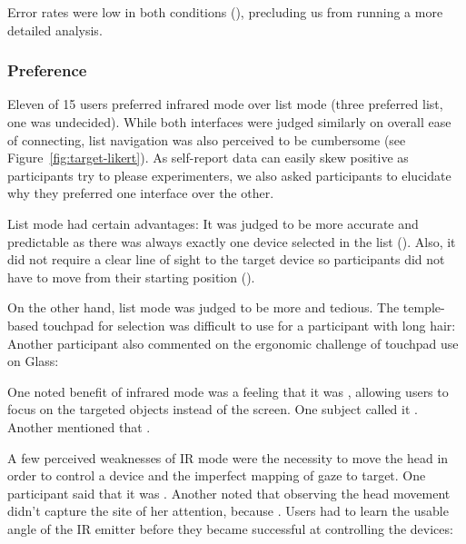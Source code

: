Error rates were low in both conditions (), precluding us from running a more detailed analysis.

\subsubsection{Preference}
Eleven of 15 users preferred infrared mode over list mode (three preferred list, one was undecided). While both interfaces were judged similarly on overall ease of connecting, list navigation was also perceived to be cumbersome (see Figure~\ref{fig:target-likert}). As self-report data can easily skew positive as participants try to please experimenters, we also asked participants to elucidate why they preferred one interface over the other.

List mode had certain advantages: It was judged to be more accurate and predictable as there was always exactly one device selected in the list (). Also, it did not require a clear line of sight to the target device so participants did not have to move from their starting position (). 

On the other hand, list mode was judged to be more  and tedious. The temple-based touchpad for selection was difficult to use for a participant with long hair:  Another participant also commented on the ergonomic challenge of touchpad use on Glass: 

One noted benefit of infrared mode was a feeling that it was , allowing users to focus on the targeted objects instead of the screen. One subject called it . Another mentioned that . 

A few perceived weaknesses of IR mode were the necessity to move the head in order to control a device and the imperfect mapping of gaze to target. One participant said that it was . Another noted that observing the head movement didn't capture the site of her attention, because . Users had to learn the usable angle of the IR emitter before they became successful at controlling the devices: 



